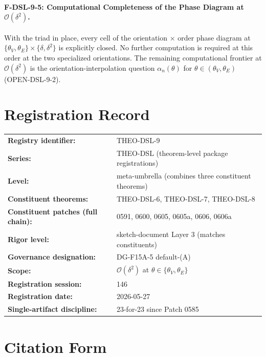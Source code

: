 \documentclass[11pt]{article}
\begin{document}
\paragraph{F-DSL-9-5: Computational Completeness of the Phase Diagram at $\mathcal{O}(\delta^2)$.}
With the triad in place, every cell of the orientation $\times$ order
phase diagram at $\{\theta_V, \theta_E\} \times \{\delta, \delta^2\}$ is
explicitly closed. No further computation is required at this order at
the two specialized orientations. The remaining computational frontier
at $\mathcal{O}(\delta^2)$ is the orientation-interpolation question
$\alpha_n(\theta)$ for $\theta \in (\theta_V, \theta_E)$ (OPEN-DSL-9-2).

\section{Registration Record}

\begin{center}
\begin{tabular}{ll}
\hline
\textbf{Registry identifier:} & THEO-DSL-9 \\
\textbf{Series:} & THEO-DSL (theorem-level package registrations) \\
\textbf{Level:} & meta-umbrella (combines three constituent theorems) \\
\textbf{Constituent theorems:} & THEO-DSL-6, THEO-DSL-7, THEO-DSL-8 \\
\textbf{Constituent patches (full chain):} & 0591, 0600, 0605, 0605a, 0606, 0606a \\
\textbf{Rigor level:} & sketch-document Layer 3 (matches constituents) \\
\textbf{Governance designation:} & DG-F15A-5 default-(A) \\
\textbf{Scope:} & $\mathcal{O}(\delta^2)$ at $\theta \in \{\theta_V, \theta_E\}$ \\
\textbf{Registration session:} & 146 \\
\textbf{Registration date:} & 2026-05-27 \\
\textbf{Single-artifact discipline:} & 23-for-23 since Patch 0585 \\
\hline
\end{tabular}
\end{center}

\section{Citation Form}
\end{document}
